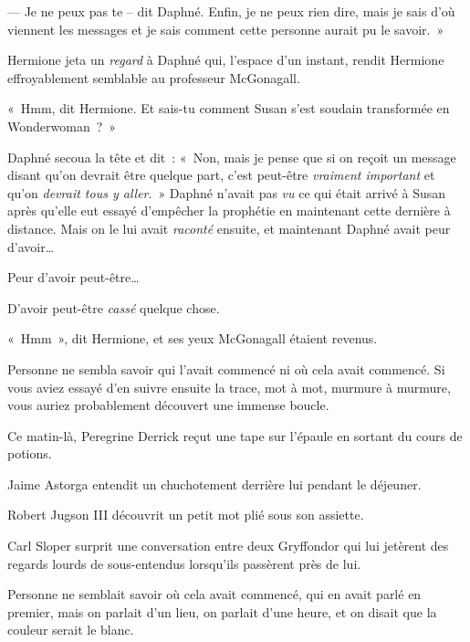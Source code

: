 --- Je ne peux pas te -- dit Daphné. Enfin, je ne peux rien dire, mais je sais d'où viennent les messages et je sais comment cette personne aurait pu le savoir.~»

Hermione jeta un \emph{regard} à Daphné qui, l'espace d'un instant, rendit Hermione effroyablement semblable au professeur McGonagall.

«~Hmm, dit Hermione. Et sais-tu comment Susan s'est soudain transformée en Wonderwoman~?~»

Daphné secoua la tête et dit~: «~Non, mais je pense que si on reçoit un message disant qu'on devrait être quelque part, c'est peut-être \emph{vraiment important} et qu'on \emph{devrait tous y aller}.~» Daphné n'avait pas \emph{vu} ce qui était arrivé à Susan après qu'elle eut essayé d'empêcher la prophétie en maintenant cette dernière à distance. Mais on le lui avait \emph{raconté} ensuite, et maintenant Daphné avait peur d'avoir…

Peur d'avoir peut-être…

D'avoir peut-être \emph{cassé} quelque chose.

«~Hmm~», dit Hermione, et ses yeux McGonagall étaient revenus.

\later

Personne ne sembla savoir qui l'avait commencé ni où cela avait commencé. Si vous aviez essayé d'en suivre ensuite la trace, mot à mot, murmure à murmure, vous auriez probablement découvert une immense boucle.

Ce matin-là, Peregrine Derrick reçut une tape sur l'épaule en sortant du cours de potions.

Jaime Astorga entendit un chuchotement derrière lui pendant le déjeuner.

Robert Jugson III découvrit un petit mot plié sous son assiette.

Carl Sloper surprit une conversation entre deux Gryffondor qui lui jetèrent des regards lourds de sous-entendus lorsqu'ils passèrent près de lui.

Personne ne semblait savoir où cela avait commencé, qui en avait parlé en premier, mais on parlait d'un lieu, on parlait d'une heure, et on disait que la couleur serait le blanc.

\later

